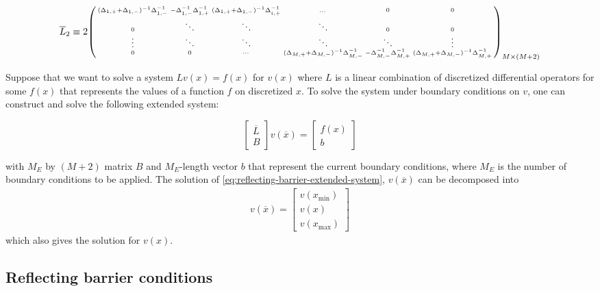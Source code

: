 \documentclass[11pt]{article}
\newenvironment{psmallmatrix}
{\left(\begin{smallmatrix}}
	{\end{smallmatrix}\right)}
\theoremstyle{definition}
\begin{document}
\begin{equation}\label{eq:L-2-extended} \small
\overline{L}_2 \equiv 2 \begin{psmallmatrix}
(\Delta_{1,+}+\Delta_{1,-})^{-1}\Delta_{1,-}^{-1} &-\Delta_{1,-}^{-1} \Delta_{1,+}^{-1}  & (\Delta_{1,+}+\Delta_{1,-})^{-1} \Delta_{i,+}^{-1}&\dots&0&0\\
0 & \ddots & \ddots &\ddots & 0 & 0\\ 
\vdots&\ddots &\ddots & \ddots & \ddots & \vdots\\ 
0&0&\cdots&
(\Delta_{M,+}+\Delta_{M,-})^{-1}\Delta_{M,-}^{-1} &-\Delta_{M,-}^{-1} \Delta_{M,+}^{-1}  & 
(\Delta_{M,+}+\Delta_{M,-})^{-1}\Delta_{M,+}^{-1}
\end{psmallmatrix}_{M\times (M+2)}
\end{equation}


Suppose that we want to solve a system $L v({x}) = f(x) $ for $v(x)$ where $L$ is a linear combination of discretized differential operators for some $f(x)$ that represents the values of a function $f$ on discretized $x$. To solve the system under boundary conditions on $v$, one can construct and solve the following extended system:

\begin{equation}\label{eq:reflecting-barrier-extended-system}
\begin{bmatrix}
\overline{L} \\
B
\end{bmatrix} 
v(\overline{x}) = 
\begin{bmatrix}
f(x) \\
b
\end{bmatrix} 
\end{equation}

with $M_E$ by $(M+2)$ matrix $B$ and $M_E$-length vector $b$ that represent the current boundary conditions, where $M_E$ is the number of boundary conditions to be applied. The solution of \eqref{eq:reflecting-barrier-extended-system}, $v(\overline{x})$ can be decomposed into 
\begin{align}
v(\overline{x}) = \begin{bmatrix}
v(x_{\min}) \\
v(x) \\
v(x_{\max})
\end{bmatrix}
\end{align}
which also gives the solution for $v(x)$.

\subsection{Reflecting barrier conditions}
\end{document}
